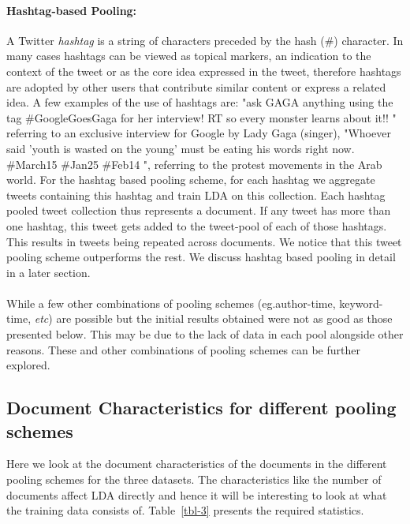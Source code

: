 \documentclass[10pt,a5paper,twoside]{article}
\begin{document}
\paragraph{Hashtag-based Pooling:}
A Twitter \textit{hashtag} is a string of characters preceded by the hash (\#) character. In many cases hashtags can be viewed as topical markers, an indication to the context of the tweet or as the core idea expressed in the tweet, therefore hashtags are adopted by other users that contribute similar content or express a related idea. A few examples of the use of hashtags are: "ask GAGA anything using the tag \#GoogleGoesGaga for her interview! RT so every monster learns about it!! " referring to an exclusive interview for Google by Lady Gaga (singer), "Whoever
said 'youth is wasted on the young' must be eating his words right now. \#March15 \#Jan25 \#Feb14 ", referring to the protest movements in the Arab world.
For the hashtag based pooling scheme, for each hashtag we aggregate tweets containing this hashtag and train LDA on this collection. Each hashtag pooled tweet collection thus represents a document. If any tweet has more than one hashtag, this tweet gets added to the tweet-pool of each of those hashtags. This results in tweets being repeated across documents. We notice that this tweet pooling scheme outperforms the rest. We discuss hashtag based pooling in detail in a later section.
\\\\
While a few other combinations of pooling schemes (eg.author-time, keyword-time, \textit{etc}) are possible but the initial results obtained were not as good as those presented below. This may be due to the lack of data in each pool alongside other reasons. These and other combinations of pooling schemes can be further explored.


\subsection{Document Characteristics for different pooling schemes}
Here we look at the document characteristics of the documents in the different pooling schemes for the three datasets. The characteristics like the number of documents affect LDA directly and hence it will be interesting to look at what the training data consists of. Table~\ref{tbl-3} presents the required statistics.
\end{document}
